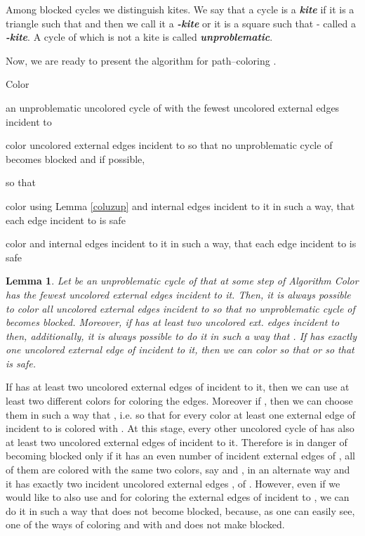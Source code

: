 \documentclass[a4, 11pt]{article}
\newcommand{\dowod}{\noindent{\bf Proof.~}}
\newcommand{\<}{\langle}
\renewcommand{\>}{\rangle}
\newtheorem{lemma}{Lemma}
\begin{document}
Among blocked cycles we distinguish kites. We say that a cycle  is a {\bf \em kite} if it is a triangle such that  and then we call it a {\bf \em -kite} or it is a square such that  - called a {\bf \em -kite}.
A cycle of  which is not a kite is called {\bf \em unproblematic}.


Now, we are ready to present the algorithm for path--coloring . \\



\begin{algorithm}
	\caption{Color }
	\label{alg:col_g1}
	\begin{algorithmic}
	    \State   an unproblematic uncolored cycle of  with the fewest 
	    uncolored external edges incident to 

	    \State color uncolored external edges incident to  so that no unproblematic cycle
	    of  becomes blocked and if possible, 
			
			\State so that 

	    \State color  using Lemma \ref{coluzup} and internal edges incident to it in such a way, that
	    each edge incident to  is safe
	  \EndWhile

	    \State color  and internal edges incident to it in such a way, that
	    each edge incident to  is safe
	  \EndWhile
	\end{algorithmic}
\end{algorithm}


\begin{lemma} 
Let  be an unproblematic  cycle of  that at some step of Algorithm Color  has  the fewest uncolored external edges  incident to it. Then, it is always possible to color all uncolored external edges incident to  so that
no unproblematic cycle of  becomes blocked. Moreover, if    has at least two uncolored ext. edges incident to   then, additionally, it is always possible to do it in such a way that  .
If  has exactly one  uncolored external edge   of  incident to it, then we can color  so that   or so that  is safe.
\end{lemma}
\dowod If  has at least two uncolored external edges of  incident to it, then we can use at least two different colors for coloring the edges. Moreover if , then we can choose them in such a way that , i.e. so that for every color  at least one external edge of  incident to  is colored with . At this stage, every other uncolored cycle  of  has also at least two uncolored external edges of  incident to it. Therefore  is in danger of becoming blocked only if it has an even number of incident external edges of ,
 all of them are colored with the same two colors, say  and ,  in an alternate way and it has exactly two incident uncolored external edges ,   of .  However,  even if we would like to also use  and  for coloring the external edges of  incident to , we can do it in such a way that  does not become blocked, because, as one can easily see, one of the ways of coloring  and  with  and 
does not make  blocked.
\end{document}
